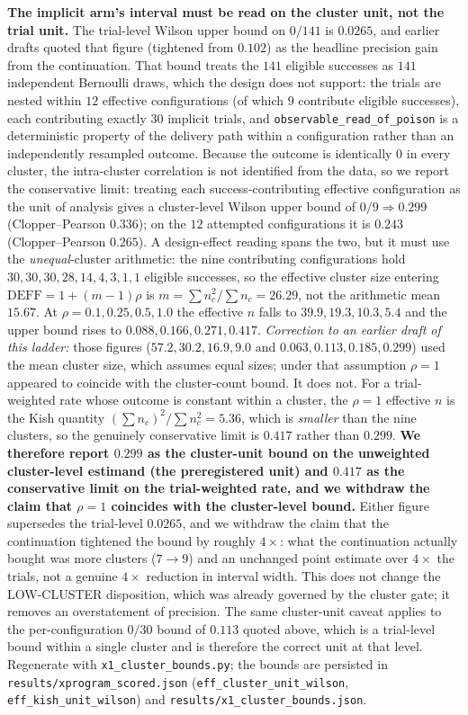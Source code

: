 \documentclass{article}
\begin{document}
\textbf{The implicit arm's interval must be read on the cluster unit, not the trial unit.} The trial-level Wilson upper bound on $0/141$ is $0.0265$, and earlier drafts quoted that figure (tightened from $0.102$) as the headline precision gain from the continuation. That bound treats the $141$ eligible successes as $141$ independent Bernoulli draws, which the design does not support: the trials are nested within $12$ effective configurations (of which $9$ contribute eligible successes), each contributing exactly $30$ implicit trials, and \texttt{observable\_read\_of\_poison} is a deterministic property of the delivery path within a configuration rather than an independently resampled outcome. Because the outcome is identically $0$ in every cluster, the intra-cluster correlation is not identified from the data, so we report the conservative limit: treating each success-contributing effective configuration as the unit of analysis gives a cluster-level Wilson upper bound of $0/9 \Rightarrow \mathbf{0.299}$ (Clopper--Pearson $0.336$); on the $12$ attempted configurations it is $0.243$ (Clopper--Pearson $0.265$). A design-effect reading spans the two, but it must use the \emph{unequal}-cluster arithmetic: the nine contributing configurations hold $30, 30, 30, 28, 14, 4, 3, 1, 1$ eligible successes, so the effective cluster size entering $\mathrm{DEFF} = 1 + (m-1)\rho$ is $m = \sum n_c^2 / \sum n_c = 26.29$, not the arithmetic mean $15.67$. At $\rho = 0.1, 0.25, 0.5, 1.0$ the effective $n$ falls to $39.9, 19.3, 10.3, 5.4$ and the upper bound rises to $0.088, 0.166, 0.271, \mathbf{0.417}$. \emph{Correction to an earlier draft of this ladder:} those figures ($57.2, 30.2, 16.9, 9.0$ and $0.063, 0.113, 0.185, 0.299$) used the mean cluster size, which assumes equal sizes; under that assumption $\rho{=}1$ appeared to coincide with the cluster-count bound. It does not. For a trial-weighted rate whose outcome is constant within a cluster, the $\rho{=}1$ effective $n$ is the Kish quantity $(\sum n_c)^2/\sum n_c^2 = 5.36$, which is \emph{smaller} than the nine clusters, so the genuinely conservative limit is $0.417$ rather than $0.299$. \textbf{We therefore report $0.299$ as the cluster-unit bound on the unweighted cluster-level estimand (the preregistered unit) and $0.417$ as the conservative limit on the trial-weighted rate, and we withdraw the claim that $\rho{=}1$ coincides with the cluster-level bound.} Either figure supersedes the trial-level $0.0265$, and we withdraw the claim that the continuation tightened the bound by roughly $4\times$: what the continuation actually bought was more clusters ($7 \to 9$) and an unchanged point estimate over $4\times$ the trials, not a genuine $4\times$ reduction in interval width. This does not change the LOW-CLUSTER disposition, which was already governed by the cluster gate; it removes an overstatement of precision. The same cluster-unit caveat applies to the per-configuration $0/30$ bound of $0.113$ quoted above, which is a trial-level bound within a single cluster and is therefore the correct unit at that level. Regenerate with \texttt{x1\_cluster\_bounds.py}; the bounds are persisted in \texttt{results/xprogram\_scored.json} (\texttt{eff\_cluster\_unit\_wilson}, \texttt{eff\_kish\_unit\_wilson}) and \texttt{results/x1\_cluster\_bounds.json}.
\end{document}

